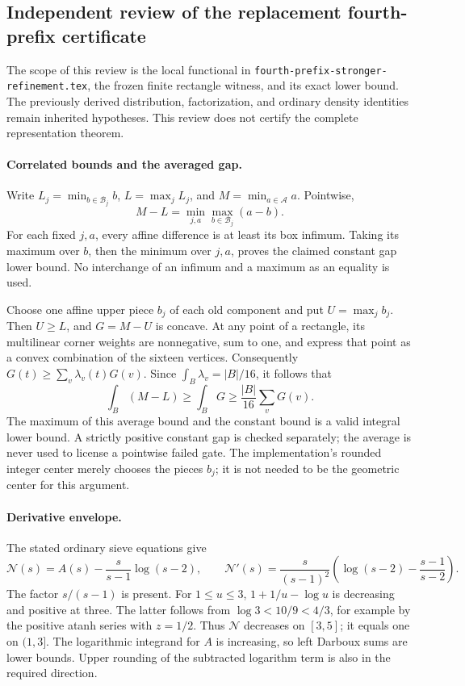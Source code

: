 \subsection{Independent review of the replacement fourth-prefix certificate}
\label{sec:stronger-fourth-independent-review}

The scope of this review is the local functional in
\texttt{fourth-prefix-stronger-refinement.tex}, the frozen finite rectangle
witness, and its exact lower bound. The previously derived distribution,
factorization, and ordinary density identities remain inherited hypotheses.
This review does not certify the complete representation theorem.

\paragraph{Correlated bounds and the averaged gap.}
Write $L_j=\min_{b\in\mathcal B_j}b$, $L=\max_jL_j$, and
$M=\min_{a\in\mathcal A}a$. Pointwise,
\[
 M-L=\min_{j,a}\max_{b\in\mathcal B_j}(a-b).
\]
For each fixed $j,a$, every affine difference is at least its box infimum.
Taking its maximum over $b$, then the minimum over $j,a$, proves the
claimed constant gap lower bound. No interchange of an infimum and a
maximum as an equality is used.

Choose one affine upper piece $b_j$ of each old component and put
$U=\max_jb_j$. Then $U\ge L$, and $G=M-U$ is concave. At any point of a
rectangle, its multilinear corner weights are nonnegative, sum to one,
and express that point as a convex combination of the sixteen vertices.
Consequently $G(t)\ge\sum_v\lambda_v(t)G(v)$. Since
$\int_B\lambda_v=|B|/16$, it follows that
\[
 \int_B(M-L)\ge\int_BG\ge\frac{|B|}{16}\sum_vG(v).
\]
The maximum of this average bound and the constant bound is a valid
integral lower bound. A strictly positive constant gap is checked
separately; the average is never used to license a pointwise failed gate.
The implementation's rounded integer center merely chooses the pieces
$b_j$; it is not needed to be the geometric center for this argument.

\paragraph{Derivative envelope.}
The stated ordinary sieve equations give
\[
 \mathcal N(s)=A(s)-\frac{s}{s-1}\log(s-2),\qquad
 \mathcal N'(s)=\frac{s}{(s-1)^2}
 \left(\log(s-2)-\frac{s-1}{s-2}\right).
\]
The factor $s/(s-1)$ is present. For $1\le u\le3$,
$1+1/u-\log u$ is decreasing and positive at three. The latter follows
from $\log3<10/9<4/3$, for example by the positive atanh series with
$z=1/2$. Thus $\mathcal N$ decreases on $[3,5]$; it equals one on
$(1,3]$. The logarithmic integrand for $A$ is increasing, so left
Darboux sums are lower bounds. Upper rounding of the subtracted logarithm
term is also in the required direction.

